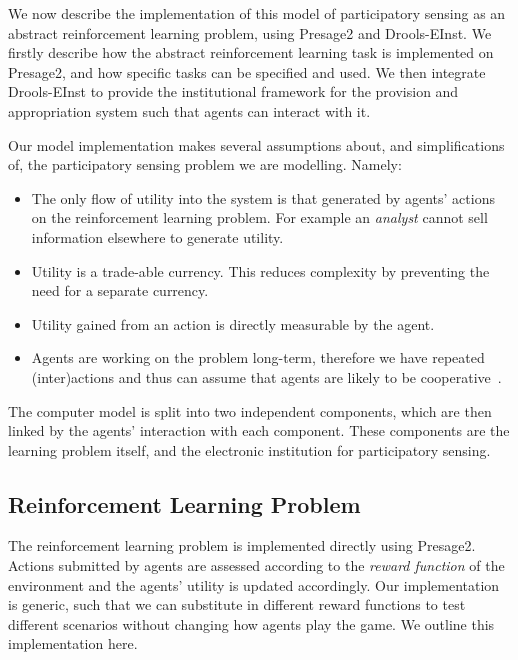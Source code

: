 We now describe the implementation of this model of participatory sensing as an abstract reinforcement learning problem, using Presage2 and Drools-EInst. We firstly describe how the abstract reinforcement learning task is implemented on Presage2, and how specific tasks can be specified and used. We then integrate Drools-EInst to provide the institutional framework for the provision and appropriation system such that agents can interact with it. 

Our model implementation makes several assumptions about, and simplifications of, the participatory sensing problem we are modelling. Namely:

\begin{itemize}
\item The only flow of utility into the system is that generated by agents' actions on the reinforcement learning problem. For example an \emph{analyst} cannot sell information elsewhere to generate utility.
\item Utility is a trade-able currency. This reduces complexity by preventing the need for a separate currency.
\item Utility gained from an action is directly measurable by the agent.
\item Agents are working on the problem long-term, therefore we have repeated (inter)actions and thus can assume that agents are likely to be cooperative~\citep{Axelrod1984}.
\end{itemize}

The computer model is split into two independent components, which are then
linked by the agents' interaction with each component. These components are
the learning problem itself, and the electronic institution for participatory
sensing.

\subsection{Reinforcement Learning Problem}

The reinforcement learning problem is implemented directly using Presage2.
Actions submitted by agents are assessed according to the \emph{reward
function} of the environment and the agents' utility is updated accordingly.
Our implementation is generic, such that we can substitute in different reward
functions to test different scenarios without changing how agents play the
game. We outline this implementation here.

